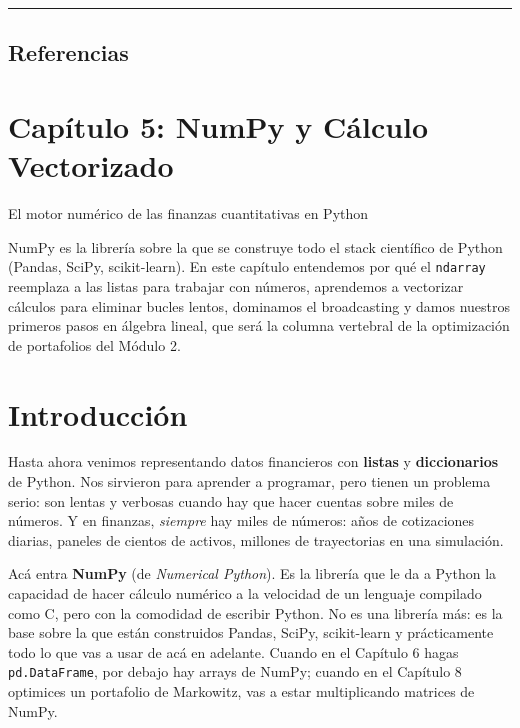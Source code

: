 \documentclass[
  spanish,
  letterpaper,
  DIV=11,
  numbers=noendperiod]{scrreprt}
\begin{document}
\begin{center}\rule{0.5\linewidth}{0.5pt}\end{center}

\section{Referencias}\label{referencias-3}

\label{refs}

\chapter{Capítulo 5: NumPy y Cálculo
Vectorizado}\label{capuxedtulo-5-numpy-y-cuxe1lculo-vectorizado}

El motor numérico de las finanzas cuantitativas en Python

NumPy es la librería sobre la que se construye todo el stack científico
de Python (Pandas, SciPy, scikit-learn). En este capítulo entendemos por
qué el \texttt{ndarray} reemplaza a las listas para trabajar con
números, aprendemos a vectorizar cálculos para eliminar bucles lentos,
dominamos el broadcasting y damos nuestros primeros pasos en álgebra
lineal, que será la columna vertebral de la optimización de portafolios
del Módulo 2.

\hfill\break

\chapter*{Introducción}\label{introducciuxf3n-4}


Hasta ahora venimos representando datos financieros con \textbf{listas}
y \textbf{diccionarios} de Python. Nos sirvieron para aprender a
programar, pero tienen un problema serio: son lentas y verbosas cuando
hay que hacer cuentas sobre miles de números. Y en finanzas,
\emph{siempre} hay miles de números: años de cotizaciones diarias,
paneles de cientos de activos, millones de trayectorias en una
simulación.

Acá entra \textbf{NumPy} (de \emph{Numerical Python}). Es la librería
que le da a Python la capacidad de hacer cálculo numérico a la velocidad
de un lenguaje compilado como C, pero con la comodidad de escribir
Python. No es una librería más: es la base sobre la que están
construidos Pandas, SciPy, scikit-learn y prácticamente todo lo que vas
a usar de acá en adelante. Cuando en el Capítulo 6 hagas
\texttt{pd.DataFrame}, por debajo hay arrays de NumPy; cuando en el
Capítulo 8 optimices un portafolio de Markowitz, vas a estar
multiplicando matrices de NumPy.
\end{document}
